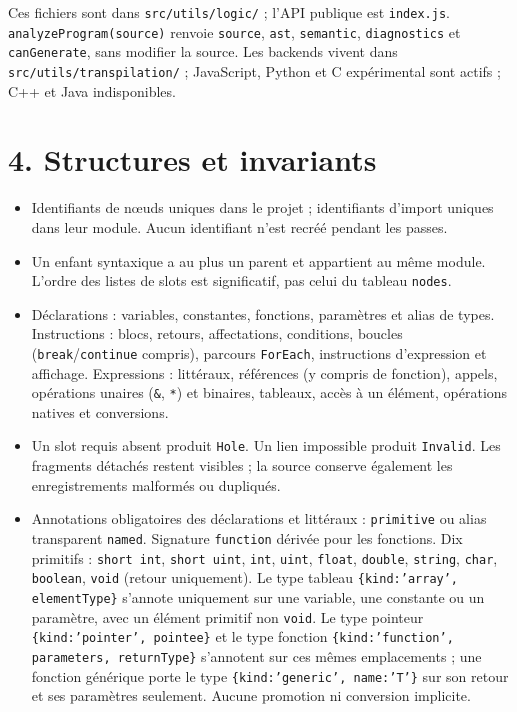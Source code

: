\documentclass[11pt,a4paper]{article}
\newcommand{\code}[1]{\texttt{#1}}
\begin{document}
Ces fichiers sont dans \code{src/utils/logic/} ; l'API publique est
\code{index.js}. \code{analyzeProgram(source)} renvoie \code{source},
\code{ast}, \code{semantic}, \code{diagnostics} et \code{canGenerate}, sans
modifier la source. Les backends vivent dans \code{src/utils/transpilation/} ;
JavaScript, Python et C expérimental sont actifs ; C++ et Java indisponibles.

\section*{4. Structures et invariants}
\begin{itemize}
\setlength{\itemsep}{1pt}
\item Identifiants de nœuds uniques dans le projet ; identifiants d'import
uniques dans leur module. Aucun identifiant n'est recréé pendant les passes.
\item Un enfant syntaxique a au plus un parent et appartient au même module.
L'ordre des listes de slots est significatif, pas celui du tableau \code{nodes}.
\item Déclarations : variables, constantes, fonctions, paramètres et alias de
types. Instructions : blocs, retours, affectations, conditions, boucles
(\code{break}/\code{continue} compris), parcours \code{ForEach}, instructions
d'expression et affichage. Expressions : littéraux, références (y compris de
fonction), appels, opérations unaires (\code{\&}, \code{*}) et binaires,
tableaux, accès à un élément, opérations natives et conversions.
\item Un slot requis absent produit \code{Hole}. Un lien impossible produit
\code{Invalid}. Les fragments détachés restent visibles ; la source conserve
également les enregistrements malformés ou dupliqués.
\item Annotations obligatoires des déclarations et littéraux : \code{primitive}
ou alias transparent \code{named}. Signature \code{function} dérivée pour les
fonctions. Dix primitifs : \code{short int}, \code{short uint}, \code{int},
\code{uint}, \code{float}, \code{double}, \code{string}, \code{char},
\code{boolean}, \code{void} (retour uniquement). Le type tableau
\code{\{kind:'array', elementType\}} s'annote uniquement sur une variable, une
constante ou un paramètre, avec un élément primitif non \code{void}. Le type
pointeur \code{\{kind:'pointer', pointee\}} et le type fonction
\code{\{kind:'function', parameters, returnType\}} s'annotent sur ces mêmes
emplacements ; une fonction générique porte le type
\code{\{kind:'generic', name:'T'\}} sur son retour et ses paramètres seulement.
Aucune promotion ni conversion implicite.
\end{itemize}
\end{document}
